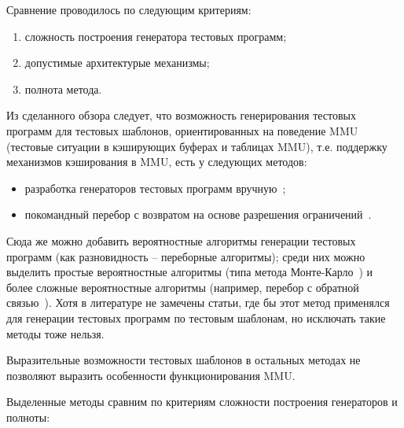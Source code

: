 
Сравнение проводилось по следующим критериям:
\begin{enumerate}
\item сложность построения генератора тестовых программ;
\item допустимые архитектурые механизмы;
\item полнота метода.
\end{enumerate}

Из сделанного обзора следует, что возможность генерирования тестовых
программ для тестовых шаблонов, ориентированных на поведение MMU
(тестовые ситуации в кэширующих буферах и таблицах MMU), т.е.
поддержку механизмов кэширования в MMU, есть у следующих методов:
\begin{itemize}
  \item разработка генераторов тестовых программ вручную~\cite{kamkin};
  \item покомандный перебор с возвратом на основе разрешения
  ограничений~\cite{GenesysPro}.
\end{itemize}
Сюда же можно добавить вероятностные алгоритмы генерации тестовых программ (как разновидность
  -- переборные алгоритмы); среди них можно выделить простые
  вероятностные алгоритмы (типа метода
  Монте-Карло~\cite{MonteKarlo}) и более сложные вероятностные
  алгоритмы (например, перебор с обратной связью~\cite{DART}). Хотя в литературе не замечены статьи, где бы этот метод применялся для генерации тестовых программ по тестовым шаблонам, но исключать такие методы тоже нельзя.

Выразительные возможности тестовых шаблонов в остальных методах не позволяют выразить особенности функционирования MMU.

Выделенные методы сравним по критериям сложности построения генераторов и полноты:

